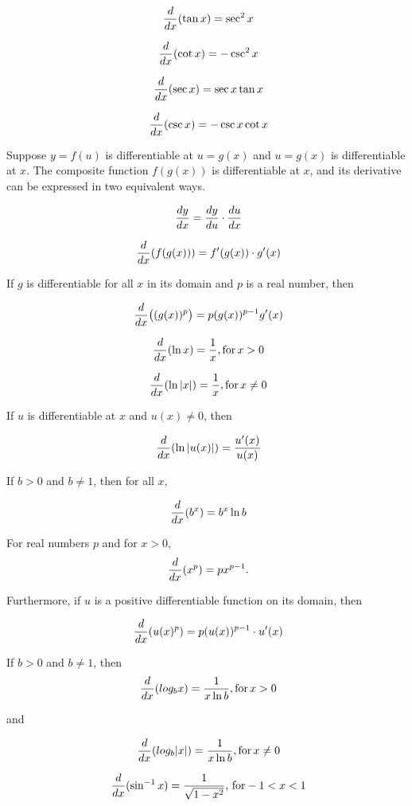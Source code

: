 $$\
{d \over dx}
(\tan x)
=
\sec^2 x
$$

$$\
{d \over dx}
(\cot x)
=
-\csc^2 x
$$

$$\
{d \over dx}
(\sec x)
=
\sec x \tan x
$$

$$\
{d \over dx}
(\csc x)
=
-\csc x \cot x
$$
\endthm

Suppose $y = f(u)$ is differentiable at $u = g(x)$ and $u = g(x)$
is differentiable at $x$. The composite function $f(g(x))$ is
differentiable at $x$, and its derivative can be expressed
in two equivalent ways.

$$\
{dy \over dx} = {dy \over du} \cdot {du \over dx}
$$

$$\
{d \over dx}(f(g(x))) = f'(g(x)) \cdot g'(x)
$$
\endthm

If $g$ is differentiable for all $x$ in its domain and $p$
is a real number, then

$$\
{d \over dx} \big((g(x))^p\big) = p(g(x))^{p - 1}g'(x)
$$
\endthm

$$\
{d \over dx} (\ln x) = {1 \over x}, \hbox{for} \, x > 0
$$

$$\
{d \over dx} (\ln |x|) = {1 \over x}, \hbox{for} \, x \ne 0
$$

If $u$ is differentiable at $x$ and $u(x) \ne 0$, then

$$\
{d \over dx} (\ln |u(x)|) = {
u'(x) \over u(x)
}
$$
\endthm

If $b > 0$ and $b \ne 1$, then for all $x$,

$$\
{d \over dx}(b^x) = b^x \ln b
$$
\endthm

For real numbers $p$ and for $x > 0$,
$$\
{d \over dx}(x^p) = px^{p - 1}.
$$

Furthermore, if $u$ is a positive differentiable function
on its domain, then

$$\
{d \over dx} (u(x)^p) = p(u(x))^{p - 1} \cdot u'(x)
$$
\endthm

If $b > 0$ and $b \ne 1$, then
$$\
{d \over dx} (log_{b} x) = {1 \over {x \ln b}}, \hbox{for}
\, x > 0
$$

and

$$\
{d \over dx}(log_{b}|x|) = {1 \over {x \ln b}}, \hbox{for}
\, x \ne 0
$$

\endthm

$$\
{d \over dx}(\sin^{-1} x) = {
1
\over
\sqrt{1 - x^2}
}, \, \hbox{for} -1 < x < 1
$$
\endthm


